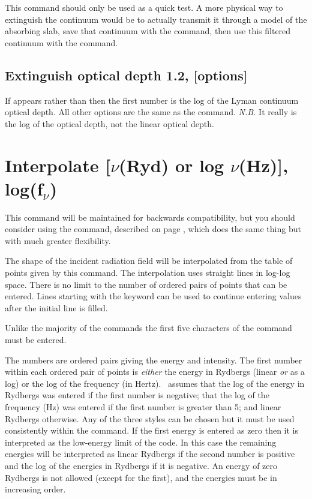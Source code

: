 This command should only be used as a quick test.  A more physical
way to extinguish the continuum would be to actually transmit it through
a model of the absorbing slab, save that continuum with the
 command,
then use this filtered continuum with
the  command.

\subsection{Extinguish optical depth 1.2, [options]}

If  appears rather than
 then the first number is
the log of the Lyman continuum optical depth.
All other options are the same as the
 command.
\emph{N.B.} It really is the log of the optical depth,
not the linear optical depth.

\section{Interpolate [$\nu$(Ryd) or log $\nu$(Hz)], log(f$_\nu$)}

This command will be maintained for backwards compatibility,
but you should consider using the  command,
described on page \pageref{sec:CommandTableSED}, 
which does the same thing but with much greater flexibility.

The shape of the incident radiation field will be interpolated from
the table of points given
by this command.
The interpolation uses straight lines in log-log space.
There is no limit to the number of ordered pairs of points that can be entered.
Lines starting with the keyword  can be used to continue entering values after
the initial  line is filled.

Unlike the majority of the commands the first five characters of the
command must be entered.

The numbers are ordered pairs giving the energy and intensity.
The first number within each ordered pair of points is \emph{either}
the energy in Rydbergs
(linear \emph{or} as a log) or the log of the frequency (in Hertz).  \Cloudy\ assumes
that the log of the energy in Rydbergs was entered if the first number is
negative; that the log of the frequency (Hz) was entered
if the first number
is greater than 5; and linear Rydbergs otherwise.
Any of the three styles
can be chosen but it must be used consistently within the command.
If the
first energy is entered as zero then it is interpreted as the low-energy
limit of the code.
In this case the remaining energies will be interpreted
as linear Rydbergs if the second number is positive and the log of the
energies in Rydbergs if it is negative.
An energy of zero Rydbergs is not
allowed (except for the first),
and the energies must be in increasing order.

